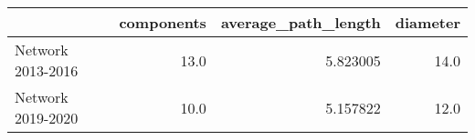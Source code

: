 \begin{tabular}{lrrr}
\toprule
{} &  components &  average\_path\_length &  diameter \\
\midrule
Network 2013-2016 &        13.0 &             5.823005 &      14.0 \\
Network 2019-2020 &        10.0 &             5.157822 &      12.0 \\
\bottomrule
\end{tabular}
